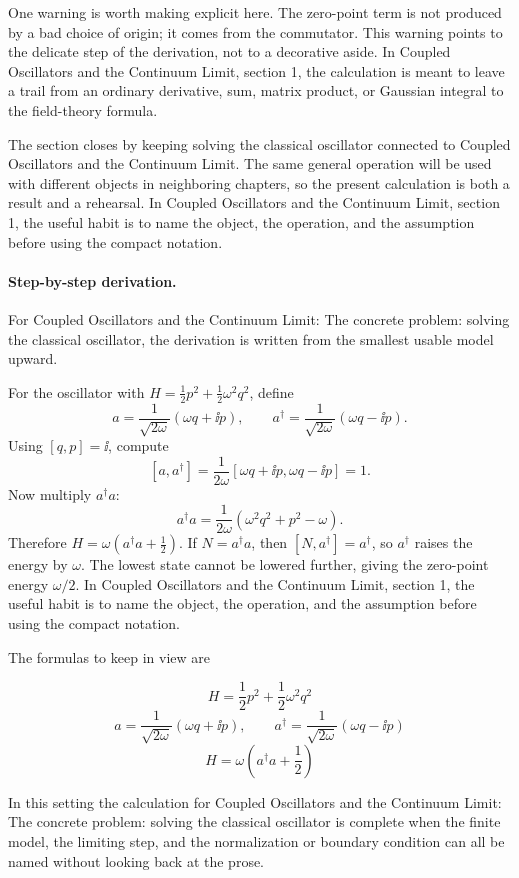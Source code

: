 One warning is worth making explicit here.  The zero-point term is not produced by a bad choice of origin; it comes from the commutator.  This warning points to the delicate step of the derivation, not to a decorative aside.  In Coupled Oscillators and the Continuum Limit, section 1, the calculation is meant to leave a trail from an ordinary derivative, sum, matrix product, or Gaussian integral to the field-theory formula.

The section closes by keeping solving the classical oscillator connected to Coupled Oscillators and the Continuum Limit.  The same general operation will be used with different objects in neighboring chapters, so the present calculation is both a result and a rehearsal.  In Coupled Oscillators and the Continuum Limit, section 1, the useful habit is to name the object, the operation, and the assumption before using the compact notation.



\paragraph{Step-by-step derivation.}

For Coupled Oscillators and the Continuum Limit: The concrete problem: solving the classical oscillator, the derivation is written from the smallest usable model upward.

For the oscillator with \(H=\frac12p^2+\frac12\omega^2q^2\), define
\[
  a=\frac{1}{\sqrt{2\omega}}(\omega q+\ii p),\qquad
  a^\dagger=\frac{1}{\sqrt{2\omega}}(\omega q-\ii p).
\]
Using \([q,p]=\ii\), compute
\[
  [a,a^\dagger]
  =
  \frac{1}{2\omega}[\omega q+\ii p,\omega q-\ii p]=1.
\]
Now multiply \(a^\dagger a\):
\[
  a^\dagger a=\frac{1}{2\omega}(\omega^2q^2+p^2-\omega).
\]
Therefore \(H=\omega(a^\dagger a+\frac12)\).  If \(N=a^\dagger a\), then \([N,a^\dagger]=a^\dagger\), so \(a^\dagger\) raises the energy by \(\omega\).  The lowest state cannot be lowered further, giving the zero-point energy \(\omega/2\).  In Coupled Oscillators and the Continuum Limit, section 1, the useful habit is to name the object, the operation, and the assumption before using the compact notation.

The formulas to keep in view are

\[
  H=\frac12p^2+\frac12\omega^2q^2
\]
\[
  a=\frac{1}{\sqrt{2\omega}}(\omega q+\ii p),\qquad a^\dagger=\frac{1}{\sqrt{2\omega}}(\omega q-\ii p)
\]
\[
  H=\omega\left(a^\dagger a+\frac12\right)
\]

In this setting the calculation for Coupled Oscillators and the Continuum Limit: The concrete problem: solving the classical oscillator is complete when the finite model, the limiting step, and the normalization or boundary condition can all be named without looking back at the prose.




